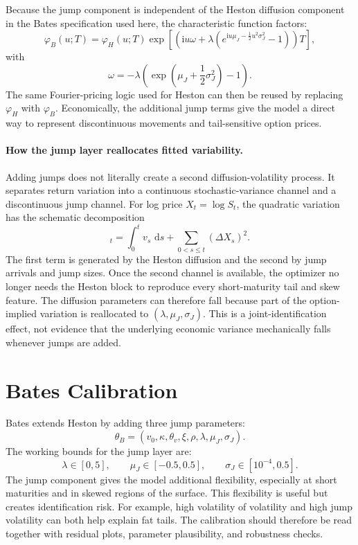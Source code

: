 \documentclass[a4paper,10pt,titlepage,oneside,openany]{book}
\theoremstyle{plain}
\theoremstyle{definition}
\theoremstyle{remark}
\newcommand{\dd}{\,\mathrm{d}}
\newcommand{\ii}{\mathrm{i}}
\begin{document}
Because the jump component is independent of the Heston diffusion component in the Bates specification used here, the characteristic function factors:
\begin{equation}
    \varphi_B(u;T)
    =
    \varphi_H(u;T)
    \exp\left[
        \left(
        \ii u\omega
        +
        \lambda
        \left(
            e^{\ii u\mu_J-\frac{1}{2}u^2\sigma_J^2}-1
        \right)
        \right)T
    \right],
    \label{eq:bates-cf}
\end{equation}
with
\[
    \omega=-\lambda\left(\exp\left(\mu_J+\frac{1}{2}\sigma_J^2\right)-1\right).
\]
The same Fourier-pricing logic used for Heston can then be reused by replacing \(\varphi_H\) with \(\varphi_B\). Economically, the additional jump terms give the model a direct way to represent discontinuous movements and tail-sensitive option prices.

\paragraph{How the jump layer reallocates fitted variability.}
Adding jumps does not literally create a second diffusion-volatility process. It separates return variation into a continuous stochastic-variance channel and a discontinuous jump channel. For log price \(X_t=\log S_t\), the quadratic variation has the schematic decomposition
\begin{equation}
    [X]_t
    =
    \int_0^t v_s\,\dd s
    +
    \sum_{0<s\leq t}(\Delta X_s)^2.
    \label{eq:quadratic-variation-split}
\end{equation}
The first term is generated by the Heston diffusion and the second by jump arrivals and jump sizes. Once the second channel is available, the optimizer no longer needs the Heston block to reproduce every short-maturity tail and skew feature. The diffusion parameters can therefore fall because part of the option-implied variation is reallocated to \((\lambda,\mu_J,\sigma_J)\). This is a joint-identification effect, not evidence that the underlying economic variance mechanically falls whenever jumps are added.

\section{Bates Calibration}

Bates extends Heston by adding three jump parameters:
\[
    \theta_B=(v_0,\kappa,\theta_v,\xi,\rho,\lambda,\mu_J,\sigma_J).
\]
The working bounds for the jump layer are:
\[
    \lambda\in[0,5],\qquad
    \mu_J\in[-0.5,0.5],\qquad
    \sigma_J\in[10^{-4},0.5].
\]
The jump component gives the model additional flexibility, especially at short maturities and in skewed regions of the surface. This flexibility is useful but creates identification risk. For example, high volatility of volatility and high jump volatility can both help explain fat tails. The calibration should therefore be read together with residual plots, parameter plausibility, and robustness checks.
\end{document}

